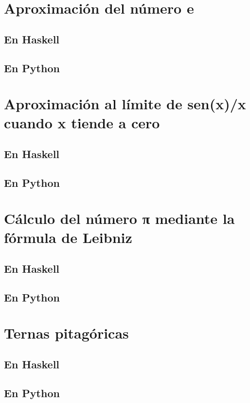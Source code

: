 \documentclass[a4paper,12pt,twoside]{book}
\begin{document}
\section{Aproximación del número e}
\subsection*{En Haskell}
\subsection*{En Python}

\section{Aproximación al límite de sen(x)/x cuando x tiende a cero}
\subsection*{En Haskell}
\subsection*{En Python}

\section{Cálculo del número π mediante la fórmula de Leibniz}
\subsection*{En Haskell}
\subsection*{En Python}

\section{Ternas pitagóricas}
\subsection*{En Haskell}
\subsection*{En Python}
\end{document}
